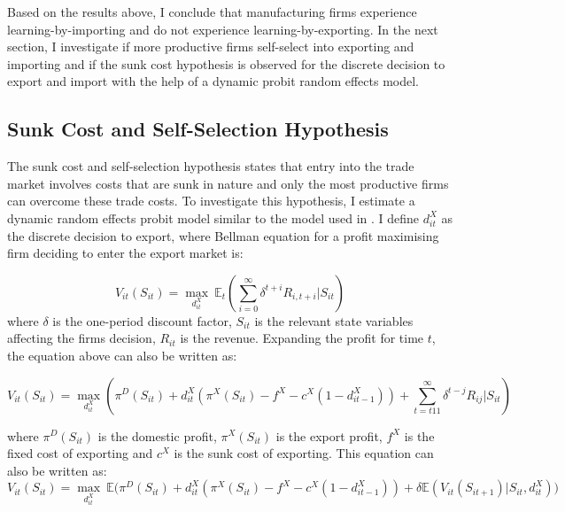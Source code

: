 \documentclass[12pt]{article}
\begin{document}
Based on the results above,  I conclude that manufacturing firms experience learning-by-importing and
do not experience learning-by-exporting. 
In the next section, I investigate if more productive firms self-select into
exporting and importing and if the sunk cost hypothesis is observed for
the discrete decision to export and import with the help of a dynamic probit
random effects model. 
\subsection{Sunk Cost and Self-Selection Hypothesis }\label{sec:ss}

The sunk cost and self-selection hypothesis states that entry into the trade market
involves   costs that are sunk in nature and only the most productive firms can
overcome these trade costs. To investigate this hypothesis, I
estimate a dynamic random effects probit model similar to the model used
in \textcite{roberts1997decision}. I define $d_{it}^{X}$ as the discrete
decision to export, where
 Bellman equation for a profit maximising firm deciding to enter the
 export market is:

 
\begin{equation}
V_{it}(S_{it})= \underset{d_{it}^{X}}{\max}\:  \mathbb{E}_{t}(\sum_{i=0}^{\infty} \delta^{t+i}R_{i,t+i}|S_{it})
\end{equation}
 where $\delta$ is the one-period discount factor, $S_{it}$ is the
 relevant state variables affecting the firms decision, $R_{it}$ is
 the revenue. Expanding the profit for time $t$, the equation above can also be written as:
 
\begin{equation}
V_{it}(S_{it})= \underset{d_{it}^{X}}{\max} (\pi^{D}(S_{it}) + d_{it}^{X}(\pi^{X}(S_{it})- f^{X} -
c^{X}(1-d_{it-1}^{X}))  + \sum_{t=t11}^{\infty} \delta^{t-j}R_{ij}|S_{it})
\end{equation}

where $\pi^{D}(S_{it})$ is the domestic profit, $\pi^{X}(S_{it})$ is the export
profit, $f^{X}$ is the fixed cost of exporting and $c^{X}$ is the sunk
cost of exporting. This equation can also be written as:
\begin{equation}
V_{it}(S_{it})= \underset{d_{it}^{X}}{\max} \:\mathbb{E}
\Big(\pi^{D}(S_{it}) + d_{it}^{X}(\pi^{X}(S_{it}) - f^{X} -
c^{X}(1-d_{it-1}^{X}))  + \delta \mathbb{E} (V_{it}(S_{it+1})|S_{it},
d_{it}^{X}) \Big)
\end{equation}
\end{document}
